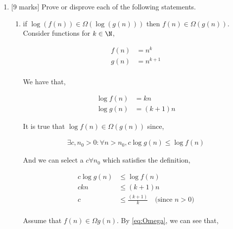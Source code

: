 \begin{enumerate}
    \item {[9 marks]} Prove or disprove each of the following statements.
          \begin{enumerate}
              \item if $\log (f(n)) \in \Omega(\log(g(n)))$ then $f(n) \in \Omega(g(n))$. \\

                    Consider functions for $k \in \N$,

                    \begin{align*}
                        f(n) & = n^{k}   \\
                        g(n) & = n^{k+1} \\
                    \end{align*}

                    We have that,

                    \begin{align*}
                        \log{f(n)} & = kn                   \\
                        \log{g(n)} & = \left(k+ 1 \right) n
                    \end{align*}

                    It is true that $\log{f(n)} \in \Omega\left(g \left( n \right) \right)$ since,

                    \begin{align}
                        \exists c, n_0 > 0: \forall n > n_0, c \log{g \left( n \right)} \le \log{f \left( n \right)} \label{eg:Omega}
                    \end{align}

                    And we can select a $c \forall n_0$ which satisfies the definition,

                    \begin{align*}
                        c \log{g \left( n \right)} & \le \log{f \left(n \right)}                                    \\
                        c kn                       & \le \left(k + 1 \right) n                                      \\
                        c                          & \le \frac{\left(k + 1 \right)}{k} \quad \text{(since $n > 0$)} \\
                    \end{align*}

                    Assume that $f \left( n \right) \in \Omega g \left( n \right)$. By \ref{eq:Omega}, we can see that,


\end{enumerate}
\end{enumerate}
